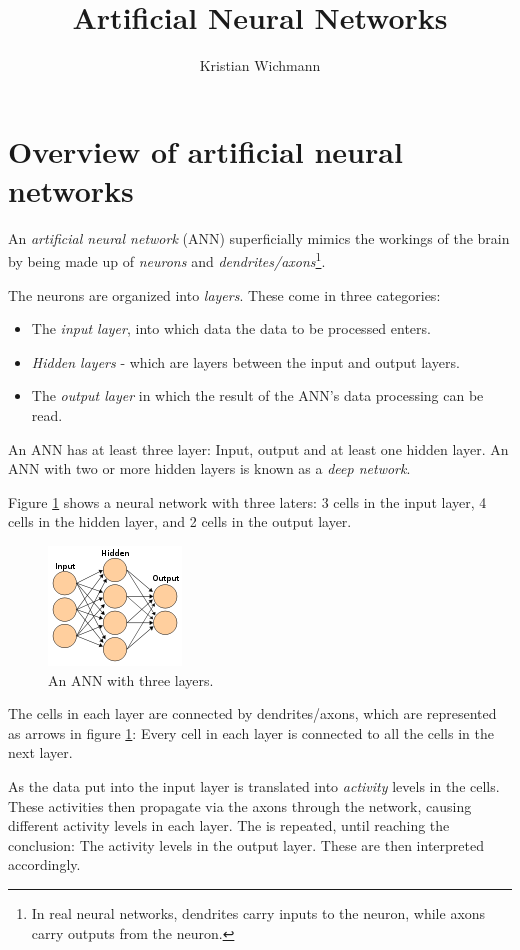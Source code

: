 \documentclass[12pt, a4paper]{article}
\title{Artificial Neural Networks}
\author{Kristian Wichmann}
\numberwithin{equation}{section}
\begin{document}
\maketitle

\section{Overview of artificial neural networks}
An \textit{artificial neural network} (ANN) superficially mimics the workings of the brain by being made up of \textit{neurons} and \textit{dendrites/axons}\footnote{In real neural networks, dendrites carry inputs to the neuron, while axons carry outputs from the neuron.}.

The neurons are organized into \textit{layers}. These come in three categories:
\begin{itemize}
\item The \textit{input layer}, into which data the data to be processed enters.
\item \textit{Hidden layers} - which are layers between the input and output layers.
\item The \textit{output layer} in which the result of the ANN's data processing can be read.
\end{itemize}

An ANN has at least three layer: Input, output and at least one hidden layer. An ANN with two or more hidden layers is known as a \textit{deep network}. 

Figure \ref{fig:ann_example} shows a neural network with three laters: 3 cells in the input layer, 4 cells in the hidden layer, and 2 cells in the output layer.

\begin{figure}
\centering
\includegraphics{artificial_neural_network}
\caption{An ANN with three layers.}
\label{fig:ann_example}
\end{figure}

The cells in each layer are connected by dendrites/axons, which are represented as arrows in figure \ref{fig:ann_example}: Every cell in each layer is connected to all the cells in the next layer.

As the data put into the input layer is translated into \textit{activity} levels in the cells. These activities then propagate via the axons through the network, causing different activity levels in each layer. The is repeated, until reaching the conclusion: The activity levels in the output layer. These are then interpreted accordingly.
\end{document}
